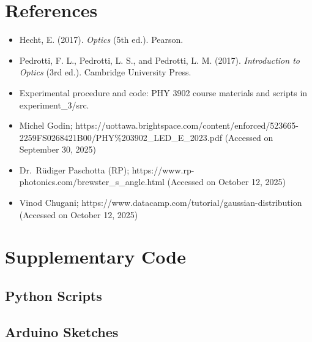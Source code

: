 \documentclass[12pt,a4paper]{article}
\begin{document}
\section{References}
\begin{itemize}
    \item Hecht, E. (2017). \textit{Optics} (5th ed.). Pearson.
    \item Pedrotti, F. L., Pedrotti, L. S., and Pedrotti, L. M. (2017). \textit{Introduction to Optics} (3rd ed.). Cambridge University Press.
    \item Experimental procedure and code: PHY 3902 course materials and scripts in experiment\_3/src.
    \item Michel Godin; https://uottawa.brightspace.com/content/enforced/523665-2259FS0268421B00/PHY\%203902\_LED\_E\_2023.pdf (Accessed on September 30, 2025)
    \item Dr.~R\"udiger Paschotta (RP); https://www.rp-photonics.com/brewster\_s\_angle.html (Accessed on October 12, 2025)
    \item Vinod Chugani; https://www.datacamp.com/tutorial/gaussian-distribution (Accessed on October 12, 2025)
\end{itemize}

\section{Supplementary Code}
\subsection*{Python Scripts}

    
    
    
    

\subsection*{Arduino Sketches}

    
    
    
    

\end{document}
